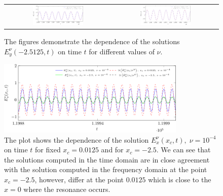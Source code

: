 \begin{figure}
\begin{tabular}{cc}
\includegraphics[width=0.5\textwidth]{res/ey_fixed_x-crop.pdf}&
\includegraphics[width=0.5\textwidth]{res/ey_fixed_x_1e3-crop.pdf}
 \end{tabular}
\caption{The figures demonstrate the dependence of the solutions 
$E_y^{\nu}(-2.5125,t)$ on time $t$ for different values of $\nu$. }
\label{fig:resonance_nus_ey_x}
\end{figure}
\begin{figure}
 \includegraphics[width=0.8\textwidth]{res/ex_fixed_x_nu1e4-crop.pdf}
 \caption{The plot shows the dependence of the solution $E_x^{\nu}(x_c,t),\;\nu=10^{-4}$ on time $t$ for fixed 
 $x_c=0.0125$ and for $x_c=-2.5$. We can see that the solutions computed in the time domain are in close agreement 
 with the solution computed in the frequency domain at the point $x_c=-2.5$, however, differ at the point $0.0125$ which is 
 close to the $x=0$ where the resonance occurs.}
 \label{fig:resonance_nus_ex_x}
\end{figure}
